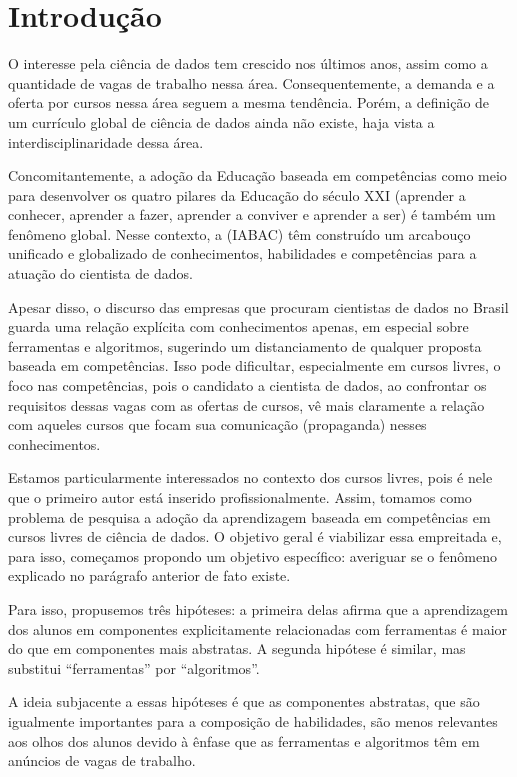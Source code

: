 \section{Introdução}

O interesse pela ciência de dados tem crescido nos últimos anos, assim como a quantidade de vagas de trabalho nessa área.
Consequentemente, a demanda e a oferta por cursos nessa área seguem a mesma tendência.
Porém, a definição de um currículo global de ciência de dados ainda não existe, haja vista a interdisciplinaridade dessa área.

Concomitantemente, a adoção da Educação baseada em competências como meio para desenvolver os quatro pilares da Educação do século XXI (aprender a conhecer, aprender a fazer, aprender a conviver e aprender a ser) é também um fenômeno global.
Nesse contexto, a  (IABAC) têm construído um arcabouço unificado e globalizado de conhecimentos, habilidades e competências para a atuação do cientista de dados.

Apesar disso, o discurso das empresas que procuram cientistas de dados no Brasil guarda uma relação explícita com conhecimentos apenas, em especial sobre ferramentas e algoritmos, sugerindo um distanciamento de qualquer proposta baseada em competências.
Isso pode dificultar, especialmente em cursos livres, o foco nas competências, pois o candidato a cientista de dados, ao confrontar os requisitos dessas vagas com as ofertas de cursos, vê mais claramente a relação com aqueles cursos que focam sua comunicação (propaganda) nesses conhecimentos.

Estamos particularmente interessados no contexto dos cursos livres, pois é nele que o primeiro autor está inserido profissionalmente.
Assim, tomamos como problema de pesquisa a adoção da aprendizagem baseada em competências em cursos livres de ciência de dados.
O objetivo geral é viabilizar essa empreitada e, para isso, começamos propondo um objetivo específico: averiguar se o fenômeno explicado no parágrafo anterior de fato existe.

Para isso, propusemos três hipóteses: a primeira delas afirma que a aprendizagem dos alunos em componentes explicitamente relacionadas com ferramentas é maior do que em componentes mais abstratas.
A segunda hipótese é similar, mas substitui ``ferramentas'' por ``algoritmos''.

A ideia subjacente a essas hipóteses é que as componentes abstratas, que são igualmente importantes para a composição de habilidades, são menos relevantes aos olhos dos alunos devido à ênfase que as ferramentas e algoritmos têm em anúncios de vagas de trabalho.

